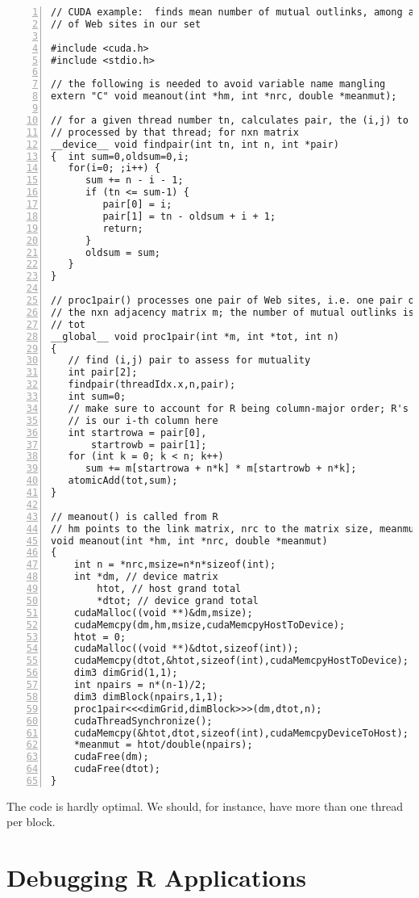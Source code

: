 \begin{lstlisting}[numbers=left]
// CUDA example:  finds mean number of mutual outlinks, among all pairs
// of Web sites in our set

#include <cuda.h>
#include <stdio.h>

// the following is needed to avoid variable name mangling
extern "C" void meanout(int *hm, int *nrc, double *meanmut);

// for a given thread number tn, calculates pair, the (i,j) to be
// processed by that thread; for nxn matrix
__device__ void findpair(int tn, int n, int *pair)
{  int sum=0,oldsum=0,i;
   for(i=0; ;i++) {
      sum += n - i - 1;
      if (tn <= sum-1) {
         pair[0] = i;
         pair[1] = tn - oldsum + i + 1;
         return;
      }
      oldsum = sum;
   }
}

// proc1pair() processes one pair of Web sites, i.e. one pair of rows in
// the nxn adjacency matrix m; the number of mutual outlinks is added to
// tot
__global__ void proc1pair(int *m, int *tot, int n)
{
   // find (i,j) pair to assess for mutuality
   int pair[2];
   findpair(threadIdx.x,n,pair);
   int sum=0; 
   // make sure to account for R being column-major order; R's i-th row
   // is our i-th column here
   int startrowa = pair[0],
       startrowb = pair[1];
   for (int k = 0; k < n; k++) 
      sum += m[startrowa + n*k] * m[startrowb + n*k];
   atomicAdd(tot,sum);
}

// meanout() is called from R
// hm points to the link matrix, nrc to the matrix size, meanmut to the output
void meanout(int *hm, int *nrc, double *meanmut)
{
    int n = *nrc,msize=n*n*sizeof(int);
    int *dm, // device matrix
        htot, // host grand total
        *dtot; // device grand total
    cudaMalloc((void **)&dm,msize);
    cudaMemcpy(dm,hm,msize,cudaMemcpyHostToDevice);
    htot = 0;
    cudaMalloc((void **)&dtot,sizeof(int));
    cudaMemcpy(dtot,&htot,sizeof(int),cudaMemcpyHostToDevice);
    dim3 dimGrid(1,1);
    int npairs = n*(n-1)/2;
    dim3 dimBlock(npairs,1,1);
    proc1pair<<<dimGrid,dimBlock>>>(dm,dtot,n);
    cudaThreadSynchronize();
    cudaMemcpy(&htot,dtot,sizeof(int),cudaMemcpyDeviceToHost);
    *meanmut = htot/double(npairs);
    cudaFree(dm);
    cudaFree(dtot);
}

\end{lstlisting}

The code is hardly optimal.  We should, for instance, have more than one
thread per block.

\section{Debugging R Applications}


